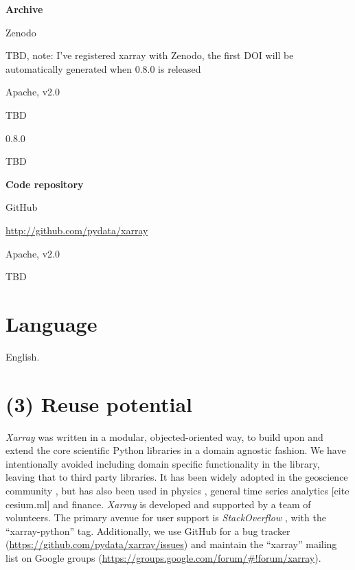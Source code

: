 \documentclass{jors}
\begin{document}
{\bf Archive}

\begin{description}[noitemsep,topsep=0pt]
	\item[Name:] Zenodo
	\item[Persistent identifier:] TBD, note: I've registered xarray with Zenodo, the first DOI will be automatically generated when 0.8.0 is released
	\item[Licence:] Apache, v2.0
	\item[Publisher:]  TBD
	\item[Version published:] 0.8.0
	\item[Date published:] TBD
\end{description}

{\bf Code repository}

\begin{description}[noitemsep,topsep=0pt]
	\item[Name:] GitHub
	\item[Persistent identifier:] \url{http://github.com/pydata/xarray}
	\item[Licence:] Apache, v2.0
	\item[Date published:] TBD
\end{description}

\section*{Language}

English.

\section*{(3) Reuse potential}

\textit{Xarray} was written in a modular, objected-oriented way, to build upon and extend the core scientific Python libraries in a domain agnostic fashion.
We have intentionally avoided including domain specific functionality in the library, leaving that to third party libraries.
It has been widely adopted in the geoscience community \citep[e.g.][]{Dawson_2016a,Dawson_2016b,xgcm}, but has also been used in physics \citep[e.g.][]{pycalphad}, general time series analytics [cite cesium.ml] and finance.
\textit{Xarray} is developed and supported by a team of volunteers. The primary avenue for user support is \textit{StackOverflow} \citep{stackoverflow}, with the ``xarray-python'' tag.
Additionally, we use GitHub for a bug tracker (\url{https://github.com/pydata/xarray/issues}) and maintain the ``xarray'' mailing list on Google groups (\url{https://groups.google.com/forum/#!forum/xarray}).
\end{document}
